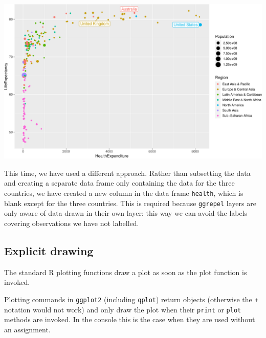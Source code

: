\documentclass[
]{book}
\begin{document}
\includegraphics[width=\textwidth]{bookdown-demo_files/figure-latex/unnamed-chunk-57-1}

This time, we have used a different approach. Rather than subsetting the data and creating a separate data frame only containing the data for the three countries, we have created a new column in the data frame \texttt{health}, which is blank except for the three countries. This is required because \texttt{ggrepel} layers are only aware of data drawn in their own layer: this way we can avoid the labels covering observations we have not labelled.

\hypertarget{explicit-drawing}{%
\subsection{Explicit drawing}\label{explicit-drawing}}

The standard R plotting functions draw a plot as soon as the plot function is invoked.

Plotting commands in \texttt{ggplot2} (including \texttt{qplot}) return objects (otherwise the \texttt{+} notation would not work) and only draw the plot when their \texttt{print} or \texttt{plot} methods are invoked. In the console this is the case when they are used without an assignment.
\end{document}
